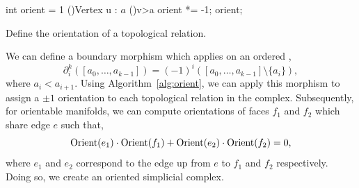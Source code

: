 \begin{algorithm}[ht!]


\SetStartEndCondition{ (}{)}{)}
\AlgoDisplayBlockMarkers\AlgoDisplayGroupMarkers\SetAlgoBlockMarkers{ \{}{ \}\ }%
\SetAlgoNoEnd\SetAlgoNoLine\DontPrintSemicolon
\SetStartEndCondition{ (}{)}{)}

\medskip
int orient = 1\;
\For(){Vertex u : $a$}{
	\lIf(){v>a}{
		orient *= -1;
	}
}
\Return orient;

\caption{Define the orientation of a topological relation.}
\label{alg:orient}
\end{algorithm}
\par We can define a boundary morphism which applies on an ordered ,
\begin{equation}
	\partial_i^k([a_0,\ldots, a_{k-1}]) = (-1)^{i}([a_0,\ldots, a_{k-1}]\setminus \{a_i\}),
\end{equation}
where $a_i < a_{i+1}$. Using Algorithm~\ref{alg:orient}, we can apply this morphism to assign a $\pm 1$ orientation to each topological relation in the complex. Subsequently, for orientable manifolds, we can compute orientations of faces $f_1$ and $f_2$ which share edge $e$ such that,
\begin{equation}
	\operatorname{Orient}(e_1)\cdot\operatorname{Orient}(f_1) + \operatorname{Orient}(e_2)\cdot\operatorname{Orient}(f_2) = 0,
\end{equation}
where $e_1$ and $e_2$ correspond to the edge up from $e$ to $f_1$ and $f_2$ respectively. Doing so, we create an oriented simplicial complex.

